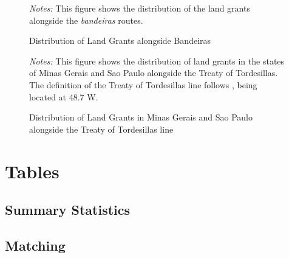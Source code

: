 \documentclass{article}
\begin{document}
\begin{figure}
  \caption{Distribution of Land Grants alongside Bandeiras}
  \begin{center}
  \textit{Notes:} This figure shows the distribution of the land grants alongside the \textit{bandeiras} routes.
  \end{center}
  \label{fig:Bandeiras}
\end{figure}

\begin{landscape}
\begin{figure}
  \caption{Distribution of Land Grants in Minas Gerais and Sao Paulo alongside the Treaty of Tordesillas line}
  \begin{center}
  \end{center}
  \textit{Notes:} This figure shows the distribution of land grants in the states of Minas Gerais and Sao Paulo alongside the Treaty of Tordesillas. The definition of the Treaty of Tordesillas line follows \textcite{Laudares2022-vy}, being located at 48.7 W.
  \label{fig:Tordesillas}
\end{figure}
\end{landscape}

\clearpage

\section*{Tables}

\subsection{Summary Statistics}



\clearpage

\subsection{Matching}
\end{document}
